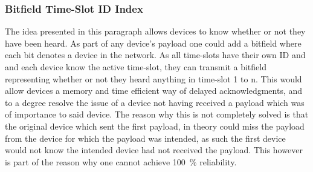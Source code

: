 \subsubsection*{Bitfield Time-Slot ID Index}
The idea presented in this paragraph allows devices to know whether or not they have been heard.
As part of any device's payload one could add a bitfield where each bit denotes a device in the network.
As all time-slots have their own ID and and each device know the active time-slot, they can transmit a bitfield representing whether or not they heard anything in time-slot 1 to n.
This would allow devices a memory and time efficient way of delayed acknowledgments, and to a degree resolve the issue of a device not having received a payload which was of importance to said device.
The reason why this is not completely solved is that the original device which sent the first payload, in theory could miss the payload from the device for which the payload was intended, as such the first device would not know the intended device had not received the payload.
This however is part of the reason why one cannot achieve 100~\% reliability.
